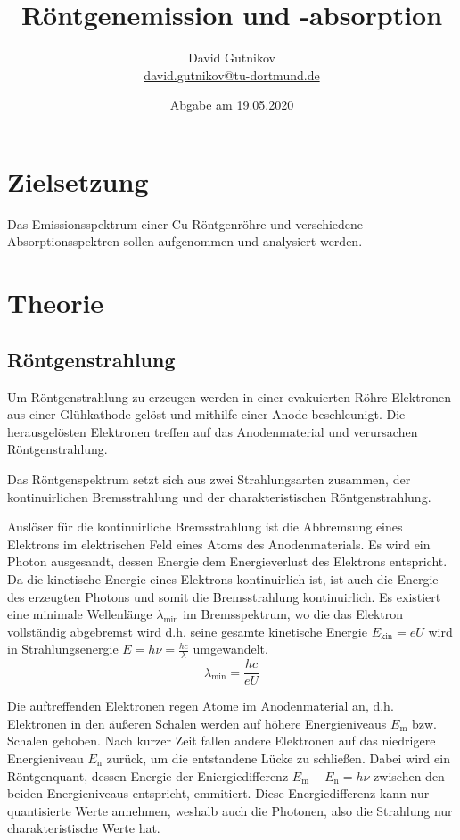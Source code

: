 \documentclass[titlepage = firstcover]{scrartcl}
\title{Röntgenemission und -absorption}
\author{David Gutnikov \\
        \href{mailto:david.gutnikov@tu-dortmund.de}{david.gutnikov@tu-dortmund.de}}
\date{Abgabe am 19.05.2020}
\begin{document}
    \maketitle
    \newpage
    \tableofcontents
    \newpage

    \section{Zielsetzung}
      Das Emissionsspektrum einer Cu-Röntgenröhre und verschiedene Absorptionsspektren sollen aufgenommen und analysiert werden.

    \section{Theorie}

      \subsection{Röntgenstrahlung}
        Um Röntgenstrahlung zu erzeugen werden in einer evakuierten Röhre Elektronen aus einer Glühkathode gelöst und mithilfe einer Anode beschleunigt. Die herausgelösten Elektronen treffen auf das Anodenmaterial und verursachen Röntgenstrahlung.

        Das Röntgenspektrum setzt sich aus zwei Strahlungsarten zusammen, der kontinuirlichen Bremsstrahlung und der charakteristischen Röntgenstrahlung.

        Auslöser für die kontinuirliche Bremsstrahlung ist die Abbremsung eines Elektrons im elektrischen Feld eines Atoms des Anodenmaterials. Es wird ein Photon ausgesandt, dessen Energie dem Energieverlust des Elektrons entspricht. Da die kinetische Energie eines Elektrons kontinuirlich ist, ist auch die Energie des erzeugten Photons und somit die Bremsstrahlung kontinuirlich. Es existiert eine minimale Wellenlänge $\lambda_\text{min}$ im Bremsspektrum, wo die das Elektron vollständig abgebremst wird d.h. seine gesamte kinetische Energie $E_\text{kin} = e U$ wird in Strahlungsenergie $E = h \nu = \frac{h c}{\lambda}$ umgewandelt.
        \begin{equation}
            \lambda_\text{min} = \frac{h c}{e U}
        \end{equation}

        Die auftreffenden Elektronen regen Atome im Anodenmaterial an, d.h. Elektronen in den äußeren Schalen werden auf höhere Energieniveaus $E_\text{m}$ bzw. Schalen gehoben. Nach kurzer Zeit fallen andere Elektronen auf das niedrigere Energieniveau $E_\text{n}$ zurück, um die entstandene Lücke zu schließen. Dabei wird ein Röntgenquant, dessen Energie der Eniergiedifferenz $E_\text{m} - E_\text{n} = h \nu$ zwischen den beiden Energieniveaus entspricht, emmitiert. Diese Energiedifferenz kann nur quantisierte Werte annehmen, weshalb auch die Photonen, also die Strahlung nur charakteristische Werte hat.
\end{document}
